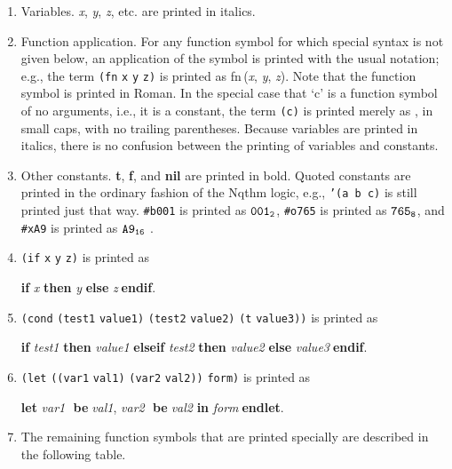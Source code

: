         \begin{enumerate}
        \item Variables.  {\it{x\/}}, {\it{y\/}}, {\it{z\/}}, etc. are printed in italics.

        \item Function application.  For any function symbol for which special
        syntax is not given below, an application of the symbol is printed with
        the usual notation; e.g., the term {\tt{(}}{\tt{fn}} {\tt{x}} {\tt{y}} {\tt{z}}{\tt{)}} is
        printed as {\rm{fn}}\,({\it{x\/}}, {\it{y\/}}, {\it{z\/}}).  Note that the function symbol is printed in
        Roman.  In the special case that `c' is a function symbol of no
        arguments, i.e., it is a constant, the term {\tt{(}}{\tt{c}}{\tt{)}} is printed merely as
        {}, in small caps, with no trailing parentheses.  Because variables are printed in
        italics, there is no confusion between the printing of variables and
        constants.

        \item Other constants.  {\bf{t}}, {\bf{f}}, and {\bf{nil}} are printed in bold.
        Quoted constants are printed in the ordinary fashion of the Nqthm logic,
        e.g., {\tt '(a b c)} is still printed just that way.  \verb+#b001+ is printed
        as ${\tt{001_{2}}}$, \verb+#o765+ is printed as ${\tt{765_{8}}}$, and \verb+#xA9+ is printed as
        ${\tt{A9_{16}}}$ .\item {\tt{(}}{\tt{if}} {\tt{x}} {\tt{y}} {\tt{z}}{\tt{)}} is printed as 

{\bf if }{\it{x\/}} {\bf then }{\it{y\/}} {\bf else }{\it{z\/}}$\;${\bf  endif}.

\item {\tt{(}}{\tt{cond}} {\tt{(}}{\tt{test1}} {\tt{value1}}{\tt{)}} {\tt{(}}{\tt{test2}} {\tt{value2}}{\tt{)}} {\tt{(}}{\tt{t}} {\tt{value3}}{\tt{)}}{\tt{)}} is printed as 

{\bf if }{\it{test1\/}} {\bf then }{\it{value1\/}} {\bf elseif }{\it{test2\/}} {\bf then }{\it{value2\/}} {\bf else }{\it{value3\/}}$\;${\bf  endif}.

\item {\tt{(}}{\tt{let}} {\tt{(}}{\tt{(}}{\tt{var1}} {\tt{val1}}{\tt{)}} {\tt{(}}{\tt{var2}} {\tt{val2}}{\tt{)}}{\tt{)}} {\tt{form}}{\tt{)}} is printed as 

{\bf let }{\it{var1\/}}{\bf $\;$ be$\;$}{\it{val1\/}}, {\it{var2\/}}{\bf $\;$ be$\;$}{\it{val2\/}} {\bf in} {\it{form\/}}$\;${\bf  endlet}.

\item  The remaining function symbols that are printed specially are
               described in the following table.

\end{enumerate}

